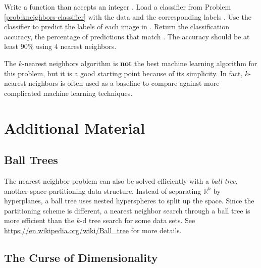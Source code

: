 \begin{problem}

Write a function than accepts an integer .
Load a classifier from Problem \ref{prob:kneighbors-classifier} %
with the data  and the corresponding labels .
Use the classifier to predict the labels of each image in .
Return the classification accuracy, the percentage of predictions that match .
The accuracy should be at least $90\%$ using $4$ nearest neighbors.
\end{problem}

\begin{info}
The $k$-nearest neighbors algorithm is \textbf{not} the best machine learning algorithm for this problem, but it is a good starting point because of its simplicity.
In fact, $k$-nearest neighbors is often used as a baseline to compare against more complicated machine learning techniques.
\end{info}

\newpage

\section*{Additional Material} %

\subsection*{Ball Trees} %

The nearest neighbor problem can also be solved efficiently with a \emph{ball tree}, another space-partitioning data structure.
Instead of separating $\mathbb{R}^k$ by hyperplanes, a ball tree uses nested hyperspheres to split up the space.
Since the partitioning scheme is different, a nearest neighbor search through a ball tree is more efficient than the $k$-d tree search for some data sets.
See \url{https://en.wikipedia.org/wiki/Ball_tree} for more details.

\subsection*{The Curse of Dimensionality} %

